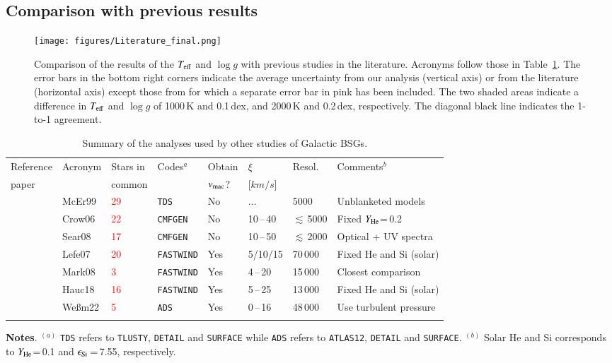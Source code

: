 \documentclass{aa}
\newcommand{\vmac} {$v_{\rm mac}$\xspace}
\newcommand{\vmic}{$\xi$\xspace}
\newcommand{\Teff}{\mbox{$T_{\rm eff}$}\xspace}
\newcommand{\logg}{\mbox{$\log g$}\xspace}
\newcommand{\He}{$Y_{\rm He}$\xspace}
\newcommand{\num}[1]{\textcolor{red}{#1}}
\newcommand{\ls}{\mbox{$\lesssim$}\,}
\begin{document}
\subsection{Comparison with previous results}
\label{subsection:42_tmp}

\begin{figure*}[t!]
\centering
\texttt{[image: figures/Literature\_final.png]}
\caption{Comparison of the results of the \Teff and \logg with previous studies in the literature. Acronyms follow those in Table~\ref{tab:lit}. The error bars in the bottom right corners indicate the average uncertainty from our analysis (vertical axis) or from the literature (horizontal axis) except those from \citet{webmayer22} for which a separate error bar in pink has been included. The two shaded areas indicate a difference in \Teff and \logg of 1000\,K and 0.1\,dex, and 2000\,K and 0.2\,dex, respectively. The diagonal black line indicates the 1-to-1 agreement.}
\label{fig:compare_lit}
\end{figure*}

\begin{table*}
  \centering
  \caption[]{Summary of the analyses used by other studies of Galactic BSGs.} 
  \label{tab:lit}
  \begin{tabular}{llllllll}
   \hline
   \hline
   \noalign{\smallskip}
   Reference & Acronym & Stars in & Codes$^{a}$ & Obtain & \vmic   & Resol. & Comments$^{b}$ \\  %
   paper     &         & common   &             & \vmac? & [$km/s$] &        &                \\  %
   \noalign{\smallskip}
   \hline
   \noalign{\smallskip}
\text{\cite{mcerlean99}} &McEr99 &\num{29} &{\tt TDS}     &No  &...        &   5000 &Unblanketed models \\
\text{\cite{crowther06}} &Crow06 &\num{22} &{\tt CMFGEN}  &No  &10\,--\,40 &\ls5000 &Fixed \He=\,0.2 \\ 
\text{\cite{searle08}}   &Sear08 &\num{17} &{\tt CMFGEN}  &No  &10\,--\,50 &\ls2000 &Optical + UV spectra \\
\text{\cite{lefever07}}  &Lefe07 &\num{20} &{\tt FASTWIND}&Yes &5/10/15    &70\,000 &Fixed He and Si (solar) \\
\text{\cite{markova08}}  &Mark08 &\num{3}  &{\tt FASTWIND}&Yes &4\,--\,20  &15\,000 &Closest comparison \\ 
\text{\cite{haucke18}}   &Hauc18 &\num{16} &{\tt FASTWIND}&Yes &5\,--\,25  &13\,000 &Fixed He and Si (solar) \\
\text{\cite{webmayer22}} &Weßm22 &\num{5}  &{\tt ADS}     &Yes &0\,--\,16  &48\,000 &Use turbulent pressure \\
   \noalign{\smallskip}
   \hline
  \end{tabular}
\begin{list}{}{}
\item {\bf Notes}. $^{(a)}$ {\tt TDS} refers to {\tt TLUSTY}, {\tt DETAIL} and {\tt SURFACE} while {\tt ADS} refers to {\tt ATLAS12}, {\tt DETAIL} and {\tt SURFACE}. $^{(b)}$ Solar He and Si corresponds to \He=\,0.1 and $\epsilon_{\rm Si}$\,=\,7.55, respectively.
\end{list}
\end{table*}
\end{document}

